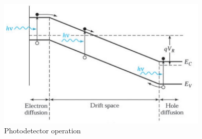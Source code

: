 \begin{figure}[h!]
	\centering
	\includegraphics[width=10cm]{figures/ch01/photodetector.jpg}
	\caption{Photodetector operation} 
	\label{fig:photodetector}
\end{figure}
